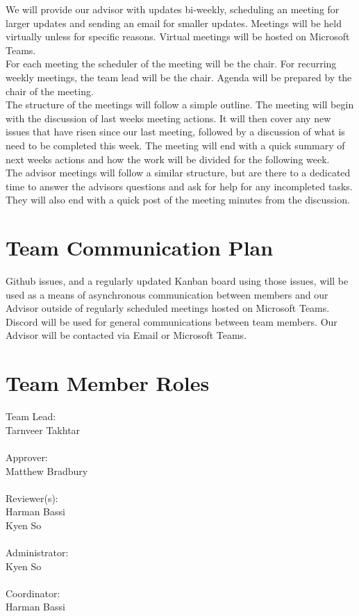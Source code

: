 \documentclass{article}
\begin{document}
We will provide our advisor with updates bi-weekly, scheduling an meeting
for larger updates and sending an email for smaller updates. Meetings will
be held virtually unless for specific reasons. Virtual meetings will be hosted on
Microsoft Teams.\\

For each meeting the scheduler of the meeting will be the chair. 
For recurring weekly meetings, the team lead will be the chair. 
Agenda will be prepared by the chair of the meeting.\\

The structure of the meetings will follow a simple outline. The meeting will begin with the discussion of last weeks meeting actions.
It will then cover any new issues that have risen since our last meeting, followed by a discussion of what is need to be completed this week. The meeting will end with a quick summary of next weeks actions and how the work will be divided for the following week.\\

The advisor meetings will follow a similar structure, but are there to a dedicated time to answer the advisors questions and ask for help for any incompleted tasks. They will also end with a quick post of the meeting minutes from the discussion. 
\section{Team Communication Plan}

Github issues, and a regularly updated Kanban board using those issues, will be used as a means of asynchronous communication 
between members and our Advisor outside of regularly scheduled meetings hosted on Microsoft Teams. 
Discord will be used for general communications between team members. Our Advisor will be contacted via Email or Microsoft Teams.

\section{Team Member Roles}
\noindent Team Lead:\\
Tarnveer Takhtar\\
\\
Approver:\\
Matthew Bradbury\\
\\
Reviewer(s):\\
Harman Bassi\\
Kyen So\\
\\
Administrator:\\
Kyen So\\
\\
Coordinator:\\
Harman Bassi\\
\end{document}
